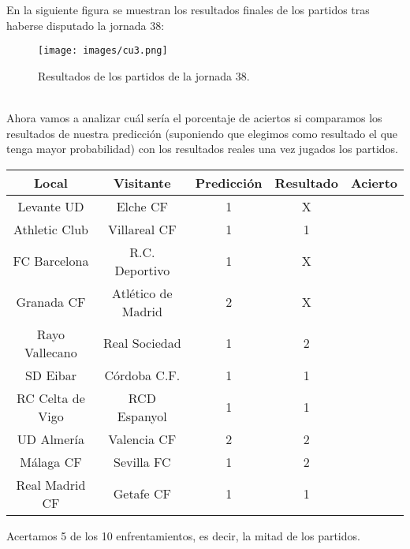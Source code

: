 \newpage

En la siguiente figura se muestran los resultados finales de los partidos tras haberse disputado la jornada 38:
\begin{figure}[H]
	\centering
	\texttt{[image: images/cu3.png]}
	\caption{Resultados de los partidos de la jornada 38.} \label{fig:result38}
\end{figure}
\ \\
Ahora vamos a analizar cuál sería el porcentaje de aciertos si comparamos los resultados de nuestra predicción (suponiendo que elegimos como resultado el que tenga mayor probabilidad) con los resultados reales una vez jugados los partidos.

\begin{center}
	\begin{tabular}{|c|c|c|c|c|}
		\hline \rowcolor{ao} Local & Visitante & Predicción & Resultado & Acierto \\ 
		\hline Levante UD & Elche CF & 1 & X & \begingroup\color{red}\xmark\endgroup \\ 
		\hline Athletic Club & Villareal CF & 1 & 1 & \begingroup\color{green}\cmark\endgroup \\ 
		\hline FC Barcelona & R.C. Deportivo & 1 & X & \begingroup\color{red}\xmark\endgroup \\ 
		\hline Granada CF & Atlético de Madrid & 2 & X & \begingroup\color{red}\xmark\endgroup \\ 
		\hline Rayo Vallecano & Real Sociedad & 1 & 2 & \begingroup\color{red}\xmark\endgroup \\ 
		\hline SD Eibar & Córdoba C.F. & 1 & 1 & \begingroup\color{green}\cmark\endgroup \\ 
		\hline RC Celta de Vigo & RCD Espanyol & 1 & 1 & \begingroup\color{green}\cmark\endgroup \\ 
		\hline UD Almería & Valencia CF & 2 & 2 & \begingroup\color{green}\cmark\endgroup \\ 
		\hline Málaga CF & Sevilla FC & 1 & 2 & \begingroup\color{red}\xmark\endgroup \\ 
		\hline Real Madrid CF & Getafe CF & 1 & 1 & \begingroup\color{green}\cmark\endgroup \\ 
		\hline 
	\end{tabular} 
\end{center}

Acertamos 5 de los 10 enfrentamientos, es decir, la mitad de los partidos.\\

\newpage

